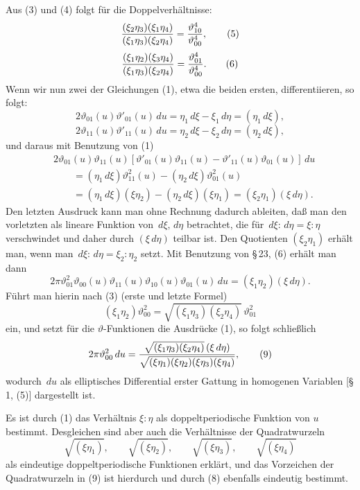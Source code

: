 \documentclass[11pt]{article}
\providecommand{\dd}{\,d}
\providecommand{\tht}{\vartheta}
\begin{document}
Aus (3) und (4) folgt für die Doppelverhältnisse:
\begin{equation}
\frac{(\xi_2\eta_3)(\xi_1\eta_4)}{(\xi_1\eta_3)(\xi_2\eta_4)}={\tht_{10}^{4}\over\tht_{00}^{4}},
\tag{5}
\end{equation}
\begin{equation}
\frac{(\xi_1\eta_2)(\xi_3\eta_4)}{(\xi_1\eta_3)(\xi_2\eta_4)}={\tht_{01}^{4}\over\tht_{00}^{4}}.
\tag{6}
\end{equation}
Wenn wir nun zwei der Gleichungen (1), etwa die beiden ersten, differentiieren, so folgt:
\[
2\tht_{01}(u)\tht'_{01}(u)\dd u=\eta_1\dd\xi-\xi_1\dd\eta=(\eta_1\dd\xi),
\]
\[
2\tht_{11}(u)\tht'_{11}(u)\dd u=\eta_2\dd\xi-\xi_2\dd\eta=(\eta_2\dd\xi),
\]
und daraus mit Benutzung von (1)
\begin{align*}
&2\tht_{01}(u)\tht_{11}(u)
\left[\tht'_{01}(u)\tht_{11}(u)-\tht'_{11}(u)\tht_{01}(u)\right]\dd u\\
&\qquad=(\eta_1\dd\xi)\tht_{11}^{2}(u)-(\eta_2\dd\xi)\tht_{01}^{2}(u)\\
&\qquad=(\eta_1\dd\xi)(\xi\eta_2)-(\eta_2\dd\xi)(\xi\eta_1)=(\xi_2\eta_1)(\xi\dd\eta).
\end{align*}
Den letzten Ausdruck kann man ohne Rechnung dadurch ableiten, daß man den vorletzten als lineare Funktion von $\dd\xi,\dd\eta$ betrachtet, die für $\dd\xi:\dd\eta=\xi:\eta$ verschwindet und daher durch $(\xi\dd\eta)$ teilbar ist. Den Quotienten $(\xi_2\eta_1)$ erhält man, wenn man $\dd\xi:\dd\eta=\xi_2:\eta_2$ setzt. Mit Benutzung von \S\,23, (6) erhält man dann
\begin{equation}
2\pi\tht_{01}^{2}\tht_{00}(u)\tht_{11}(u)\tht_{10}(u)\tht_{01}(u)\dd u=(\xi_1\eta_2)(\xi\dd\eta).
\tag{7}
\end{equation}
Führt man hierin nach (3) (erste und letzte Formel)
\begin{equation}
(\xi_1\eta_2)\tht_{00}^{2}=\sqrt{(\xi_1\eta_3)(\xi_2\eta_4)}\,\tht_{01}^{2}
\tag{8}
\end{equation}
ein, und setzt für die $\vartheta$-Funktionen die Ausdrücke (1), so folgt schließlich
\begin{equation}
2\pi\tht_{00}^{2}\dd u=
{\sqrt{(\xi_1\eta_3)(\xi_2\eta_4)}\,(\xi\dd\eta)
\over
\sqrt{(\xi\eta_1)(\xi\eta_2)(\xi\eta_3)(\xi\eta_4)}} ,
\tag{9}
\end{equation}
wodurch $\dd u$ als elliptisches Differential erster Gattung in homogenen Variablen [\S\,1, (5)] dargestellt ist.

Es ist durch (1) das Verhältnis $\xi:\eta$ als doppeltperiodische Funktion von $u$ bestimmt. Desgleichen sind aber auch die Verhältnisse der Quadratwurzeln
\begin{equation}
\sqrt{(\xi\eta_1)},\qquad \sqrt{(\xi\eta_2)},\qquad
\sqrt{(\xi\eta_3)},\qquad \sqrt{(\xi\eta_4)}
\tag{10}
\end{equation}
als eindeutige doppeltperiodische Funktionen erklärt, und das Vorzeichen der Quadratwurzeln in (9) ist hierdurch und durch (8) ebenfalls eindeutig bestimmt.
\end{document}
